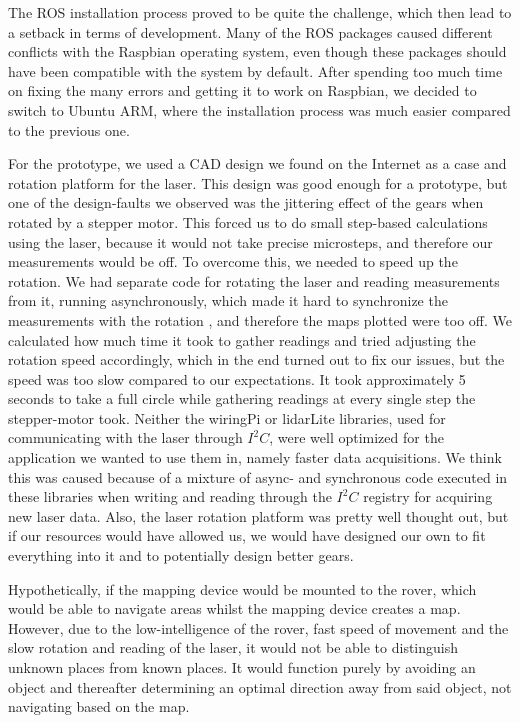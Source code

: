 The ROS installation process proved to be quite the challenge, which then lead to a setback in terms of development. Many of the ROS packages caused different conflicts with the Raspbian operating system, even though these packages should have been compatible with the system by default. After spending too much time on fixing the many errors and getting it to work on Raspbian, we decided to switch to Ubuntu ARM, where the installation process was much easier compared to the previous one.

For the prototype, we used a CAD design we found on the Internet as a case and rotation platform for the laser. This design was good enough for a prototype, but one of the design-faults we observed was the jittering effect of the gears when rotated by a stepper motor. This forced us to do small step-based calculations using the laser, because it would not take precise microsteps, and therefore our measurements would be off. To overcome this, we needed to speed up the rotation. We had separate code for rotating the laser and reading measurements from it, running asynchronously, which made it hard to synchronize the measurements with the rotation , and therefore the maps plotted were too off. We calculated how much time it took to gather readings and tried adjusting the rotation speed accordingly, which in the end turned out to fix our issues, but the speed was too slow compared to our expectations. It took approximately 5 seconds to take a full circle
 while gathering readings at every single step the stepper-motor took. Neither the wiringPi or lidarLite libraries, used for communicating with the laser through $I^2C$, were well optimized for the application we wanted to use them in, namely faster data acquisitions. We think this was caused because of a mixture of async- and synchronous code executed in these libraries when writing and reading through the $I^2C$ registry for acquiring new laser data. Also, the laser rotation platform was pretty well thought out, but if our resources would have allowed us, we would have designed our own to fit everything into it and to potentially design better gears.

Hypothetically, if the mapping device would be mounted to the rover, which would be able to navigate areas whilst the mapping device creates a map. However, due to the low-intelligence of the rover, fast speed of movement and the slow rotation and reading of the laser, it would not be able to distinguish unknown places from known places. It would function purely by avoiding an object and thereafter determining an optimal direction away from said object, not navigating based on the map. 

